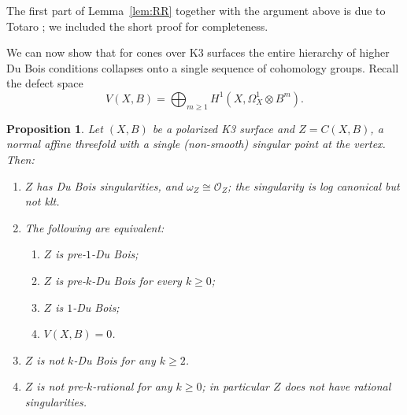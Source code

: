 \documentclass[11pt]{amsart}
\numberwithin{equation}{section}
\theoremstyle{plain}
\newtheorem{proposition}[theorem]{Proposition}
\theoremstyle{definition}
\theoremstyle{remark}
\newcommand{\cO}{\mathcal{O}}
\begin{document}
The first part of Lemma~\ref{lem:RR} together with the argument above is due to Totaro \cite[Thm.~3.1]{Tot}; we included the short proof for completeness.

We can now show that for cones over K3 surfaces the entire hierarchy of higher Du Bois conditions collapses onto a single sequence of cohomology groups.
Recall the defect space
\[
V(X,B)=\bigoplus_{m\ge 1}H^1\!\left(X,\Omega^1_X\otimes B^{m}\right).
\]

\begin{proposition}\label{prop:structure}
Let $(X,B)$ be a polarized K3 surface and $Z=C(X,B)$, a normal affine threefold with a single (non-smooth) singular point at the vertex. Then:
\begin{enumerate}
\item $Z$ has Du Bois singularities, and $\omega_Z\cong\cO_Z$; the singularity is log canonical but not klt.
\item The following are equivalent:
\begin{enumerate}
\item[(i)] $Z$ is pre-$1$-Du Bois;
\item[(ii)] $Z$ is pre-$k$-Du Bois for every $k\ge0$;
\item[(iii)] $Z$ is $1$-Du Bois;
\item[(iv)] $V(X,B)=0$.
\end{enumerate}
\item $Z$ is not $k$-Du Bois for any $k\ge2$.
\item $Z$ is not pre-$k$-rational for any $k\ge0$; in particular $Z$ does not have rational singularities.
\end{enumerate}
\end{proposition}
\end{document}
